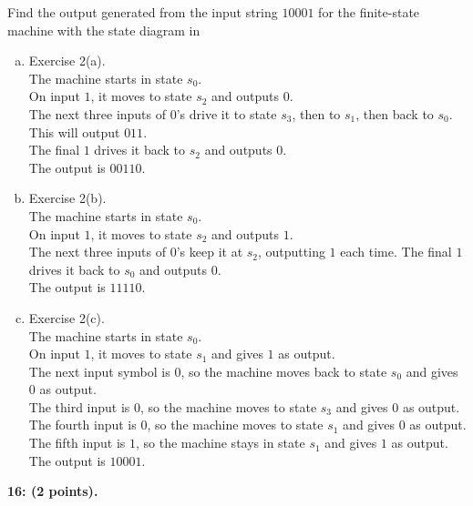 \documentclass[12pt]{article}  %
\begin{document}
\noindent
Find the output generated from the input string $10001$ for the finite-state machine with the state diagram in
\begin{enumerate}[a)]
    \item Exercise 2(a).\\
    The machine starts in state $s_0$.\\
    On input $1$, it moves to state $s_2$ and outputs $0$.\\
    The next three inputs of 0's drive it to state $s_3$, then to $s_1$, then back to $s_0$. This will output $011$.\\
    The final $1$ drives it back to $s_2$ and outputs $0$.\\
    The output is $00110$.
    \item Exercise 2(b).\\
    The machine starts in state $s_0$.\\
    On input $1$, it moves to state $s_2$ and outputs $1$.\\
    The next three inputs of 0's keep it at $s_2$, outputting $1$ each time.
    The final $1$ drives it back to $s_0$ and outputs $0$.\\
    The output is $11110$.
    \item Exercise 2(c).\\
    The machine starts in state $s_0$.\\
    On input $1$, it moves to state $s_1$ and gives $1$ as output.\\
    The next input symbol is $0$, so the machine moves back to state $s_0$ and gives $0$ as output.\\
    The third input is $0$, so the machine moves to state $s_3$ and gives $0$ as output.\\
    The fourth input is $0$, so the machine moves to state $s_1$ and gives $0$ as output.\\
    The fifth input is $1$, so the machine stays in state $s_1$ and gives $1$ as output.\\
    The output is $10001$.
\end{enumerate}

\clearpage
\noindent
{\bf 16: (2 points).}
\end{document}
